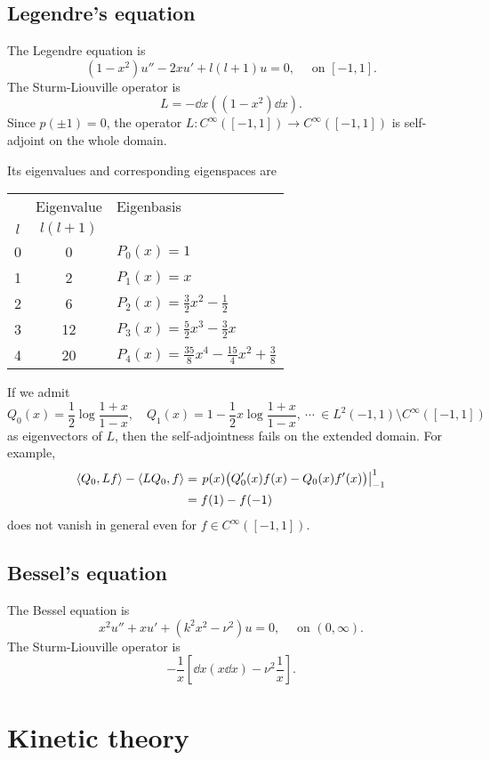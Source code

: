 \documentclass[11pt]{article}
\let\realsection\section
\renewcommand\section{\newpage\realsection}
\begin{document}
\subsection{Legendre's equation}
The Legendre equation is
\[(1-x^2)u''-2xu'+l(l+1)u=0,\quad\text{ on }[-1,1].\]
The Sturm-Liouville operator is
\[L=-\dd{x}\left((1-x^2)\dd{x}\right).\]
Since $p(\pm1)=0$, the operator $L:C^\infty([-1,1])\to C^\infty([-1,1])$ is self-adjoint on the whole domain.


Its eigenvalues and corresponding eigenspaces are
\begin{center}\renewcommand{\arraystretch}{1.2}
\begin{tabular}{c|c|l}
\hline
    & Eigenvalue & Eigenbasis \\
$l$ & $l(l+1)$   & \\
\hline
0   & 0          & $P_0(x)=1$ \\
1   & 2          & $P_1(x)=x$ \\
2   & 6          & $P_2(x)=\frac32x^2-\frac12$ \\
3   & 12         & $P_3(x)=\frac52x^3-\frac32x$ \\
4   & 20         & $P_4(x)=\frac{35}8x^4-\frac{15}4x^2+\frac38$\\
\hline
\end{tabular}
\end{center}
If we admit
\[Q_0(x)=\frac12\log\frac{1+x}{1-x},\quad Q_1(x)=1-\frac12x\log\frac{1+x}{1-x},\ \cdots\ \in L^2(-1,1)\setminus C^\infty([-1,1])\]
as eigenvectors of $L$, then the self-adjointness fails on the extended domain.
For example,
\begin{align*}
\langle Q_0,Lf\rangle-\langle LQ_0,f\rangle
&=\left.p(x)\bigl(Q_0'(x)f(x)-Q_0(x)f'(x)\bigr)\right|_{-1}^1\\
&=f(1)-f(-1)
\end{align*}
does not vanish in general even for $f\in C^\infty([-1,1])$.

\subsection{Bessel's equation}
The Bessel equation is
\[x^2u''+xu'+(k^2x^2-\nu^2)u=0,\quad\text{ on }(0,\infty).\]
The Sturm-Liouville operator is
\[-\frac1x\left[\dd{x}\left(x\dd{x}\right)-\nu^2\frac1x\right].\]









\section{Kinetic theory}
\end{document}

